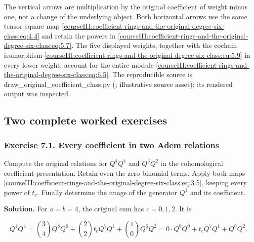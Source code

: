 The vertical arrows are multiplication by the original coefficient of weight minus one, not a change of the underlying object. Both horizontal arrows use the same tensor-square map \eqref{courseIII:coefficient-rings-and-the-original-degree-six-class:eq:4.4} and retain the powers in \eqref{courseIII:coefficient-rings-and-the-original-degree-six-class:eq:5.7}. The five displayed weights, together with the cochain isomorphism \eqref{courseIII:coefficient-rings-and-the-original-degree-six-class:eq:5.9} in every lower weight, account for the entire module \eqref{courseIII:coefficient-rings-and-the-original-degree-six-class:eq:6.5}. The reproducible source is draw\_original\_coefficient\_class.py (; illustrative source asset); its rendered output was inspected.

\label{courseIII:coefficient-rings-and-the-original-degree-six-class:coefficient-worked-exercises}

\subsection{Two complete worked exercises}
\label{courseIII:coefficient-rings-and-the-original-degree-six-class:section-7}

\subsubsection{Exercise 7.1. Every coefficient in two Adem relations}
\label{courseIII:coefficient-rings-and-the-original-degree-six-class:exercise-7.1}

\label{courseIII:coefficient-rings:7.1}

Compute the original relations for \(Q^4Q^4\) and \(Q^3Q^2\) in the cohomological coefficient presentation. Retain even the zero binomial terms. Apply both maps \eqref{courseIII:coefficient-rings-and-the-original-degree-six-class:eq:3.5}, keeping every power of \(t_{\mathrm c}\). Finally determine the image of the generator \(Q^1\) and its coefficient.

\textbf{Solution.} For \(a=b=4\), the original sum has \(c=0,1,2\). It is

\begin{equation}
Q^4Q^4
  =\binom34 Q^8Q^0
    +\binom22 t_{\mathrm c}Q^7Q^1
    +\binom10 Q^6Q^2
  =0\cdot Q^8Q^0+t_{\mathrm c}Q^7Q^1+Q^6Q^2.
 \label{courseIII:coefficient-rings-and-the-original-degree-six-class:eq:7.1}
\end{equation}

